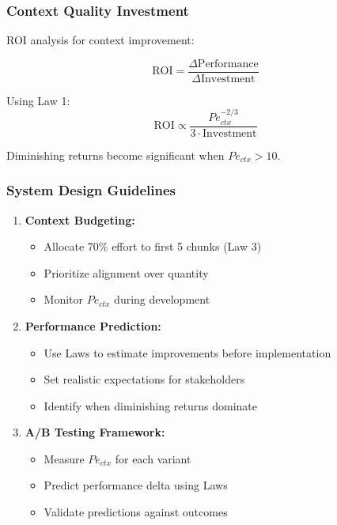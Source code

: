 \documentclass[conference]{IEEEtran}
\begin{document}
\subsubsection{Context Quality Investment}

ROI analysis for context improvement:

\begin{equation}
\text{ROI} = \frac{\Delta \text{Performance}}{\Delta \text{Investment}}
\end{equation}

Using Law 1:
\begin{equation}
\text{ROI} \propto \frac{Pe_{ctx}^{-2/3}}{3 \cdot \text{Investment}}
\end{equation}

Diminishing returns become significant when $Pe_{ctx} > 10$.

\subsubsection{System Design Guidelines}

\begin{enumerate}
\item \textbf{Context Budgeting:}
   \begin{itemize}
   \item Allocate 70\% effort to first 5 chunks (Law 3)
   \item Prioritize alignment over quantity
   \item Monitor $Pe_{ctx}$ during development
   \end{itemize}

\item \textbf{Performance Prediction:}
   \begin{itemize}
   \item Use Laws to estimate improvements before implementation
   \item Set realistic expectations for stakeholders
   \item Identify when diminishing returns dominate
   \end{itemize}

\item \textbf{A/B Testing Framework:}
   \begin{itemize}
   \item Measure $Pe_{ctx}$ for each variant
   \item Predict performance delta using Laws
   \item Validate predictions against outcomes
   \end{itemize}
\end{enumerate}
\end{document}

